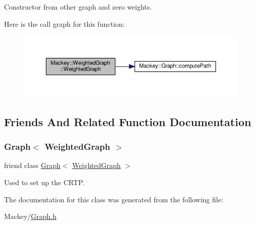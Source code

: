 Constructor from other graph and zero weights. 

Here is the call graph for this function\+:\nopagebreak
\begin{figure}[H]
\begin{center}
\leavevmode
\includegraphics[width=350pt]{classMackey_1_1WeightedGraph_ad5932440f83ea50f802d96b44c2da5e3_cgraph}
\end{center}
\end{figure}


\subsection{Friends And Related Function Documentation}
\mbox{\label{classMackey_1_1WeightedGraph_aa4863e14b8d7dcd76942894cae55e453}} 
\subsubsection{\texorpdfstring{Graph$<$ Weighted\+Graph $>$}{Graph< WeightedGraph >}}
{\footnotesize\ttfamily friend class \hyperlink{classMackey_1_1Graph}{Graph}$<$ \hyperlink{classMackey_1_1WeightedGraph}{Weighted\+Graph} $>$\hspace{0.3cm}{\ttfamily [friend]}}



Used to set up the C\+R\+TP. 



The documentation for this class was generated from the following file\+:\begin{DoxyCompactItemize}
\item 
Mackey/\hyperlink{Graph_8h}{Graph.\+h}\end{DoxyCompactItemize}
